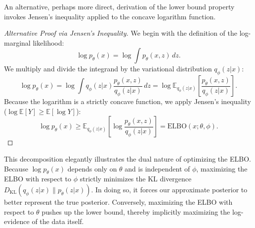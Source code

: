 An alternative, perhaps more direct, derivation of the lower bound property invokes Jensen's inequality applied to the concave logarithm function.

\begin{proof}[Alternative Proof via Jensen's Inequality]
We begin with the definition of the log-marginal likelihood:
\begin{equation}
    \log p_\theta(x) = \log \int p_\theta(x, z) \, dz.
\end{equation}
We multiply and divide the integrand by the variational distribution $q_\phi(z|x)$:
\begin{equation}
    \log p_\theta(x) = \log \int q_\phi(z|x) \frac{p_\theta(x, z)}{q_\phi(z|x)} \, dz = \log \mathbb{E}_{q_\phi(z|x)}\left[ \frac{p_\theta(x, z)}{q_\phi(z|x)} \right].
\end{equation}
Because the logarithm is a strictly concave function, we apply Jensen's inequality ($\log \mathbb{E}[Y] \geq \mathbb{E}[\log Y]$):
\begin{equation}
    \log p_\theta(x) \geq \mathbb{E}_{q_\phi(z|x)}\left[ \log \frac{p_\theta(x, z)}{q_\phi(z|x)} \right] = \mathrm{ELBO}(x; \theta, \phi).
\end{equation}
\end{proof}

This decomposition elegantly illustrates the dual nature of optimizing the ELBO. Because $\log p_\theta(x)$ depends only on $\theta$ and is independent of $\phi$, maximizing the ELBO with respect to $\phi$ strictly minimizes the KL divergence $D_{\mathrm{KL}}(q_\phi(z|x) \parallel p_\theta(z|x))$. In doing so, it forces our approximate posterior to better represent the true posterior. Conversely, maximizing the ELBO with respect to $\theta$ pushes up the lower bound, thereby implicitly maximizing the log-evidence of the data itself.

